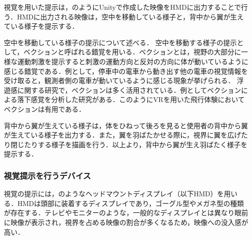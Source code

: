         視覚を用いた提示は，のようにUnityで作成した映像をHMDに出力することで行う．HMDに出力される映像は，空中を移動している様子と，背中から翼が生えている様子を提示する．

        空中を移動している様子の提示について述べる．
        空中を移動する様子の提示として，ベクションと呼ばれる錯覚を用いる．ベクションとは，視野の大部分に一様な運動刺激を提示すると刺激の運動方向と反対の方向に体が動いているように感じる錯覚である\cite{妹尾武治2014ベクションとその周辺の近年の動向}．例として，停車中の電車から動き出す他の電車の視覚情報を受け取ると，観測者側の電車が動いているように感じる現象が挙げられる．
        浮遊感に関する研究で，ベクションは多く活用されている．例としてベクションによる落下感覚を分析した研究がある\cite{奥川夏輝2017VR空間における視覚刺激によって発生する落下感覚の分析}．このようにVRを用いた飛行体験においてベクションは有用である．

        背中から翼が生えている様子は，体をひねって後ろを見ると使用者の背中から翼が生えている様子を出力する．また，翼を羽ばたかせる際に，視界に翼を広げたり閉じたりする様子を描画を行う．以上より，背中から翼が生え羽ばたく様子を提示する．

        \subsubsection{視覚提示を行うデバイス}

            視覚の提示には，のようなヘッドマウントディスプレイ（以下HMD）を用いる．HMDは頭部に装着するディスプレイであり，ゴーグル型やメガネ型の種類が存在する．テレビやモニターのような，一般的なディスプレイとは異なり眼前に映像が表示され，視界を占める映像の割合が多くなるため，映像への没入感が高い．

